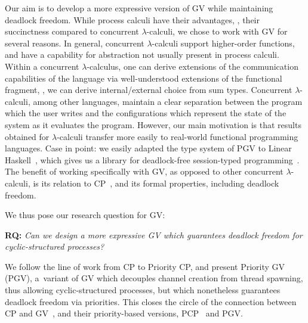 Our aim is to develop a more expressive version of GV while maintaining deadlock freedom. While process calculi have their advantages, \eg, their succinctness compared to concurrent $\lambda$-calculi, we chose to work with GV for several reasons. In general, concurrent $\lambda$-calculi support higher-order functions, and have a capability for abstraction not usually present in process calculi. Within a concurrent $\lambda$-calculus, one can derive extensions of the communication capabilities of the language via well-understood extensions of the functional fragment, \eg, we can derive internal/external choice from sum types. Concurrent $\lambda$-calculi, among other languages, maintain a clear separation between the program which the user writes and the configurations which represent the state of the system as it evaluates the program. However, our main motivation is that results obtained for $\lambda$-calculi transfer more easily to real-world functional programming languages. Case in point: we easily adapted the type system of PGV to Linear Haskell~\cite{bernardyboespflug18}, which gives us a library for deadlock-free session-typed programming~\cite{kokkedardha21hs}.
The benefit of working specifically with GV, as opposed to other concurrent $\lambda$-calculi, is its relation to CP~\cite{wadler14}, and its formal properties, including deadlock freedom.

We thus pose our research question for GV:

\vspace{1em}
  \textbf{RQ:}
  \emph{Can we design a more expressive GV which guarantees deadlock freedom for cyclic-structured processes?}
\vspace{1em}

We follow the line of work from CP to Priority CP, and present Priority GV (PGV), a~variant of GV which decouples channel creation from thread spawning, thus allowing cyclic-structured processes, but which nonetheless guarantees deadlock freedom via priorities. This closes the circle of the connection between CP and GV~\cite{wadler14}, and their priority-based versions, PCP~\cite{dardhagay18extended} and PGV.

